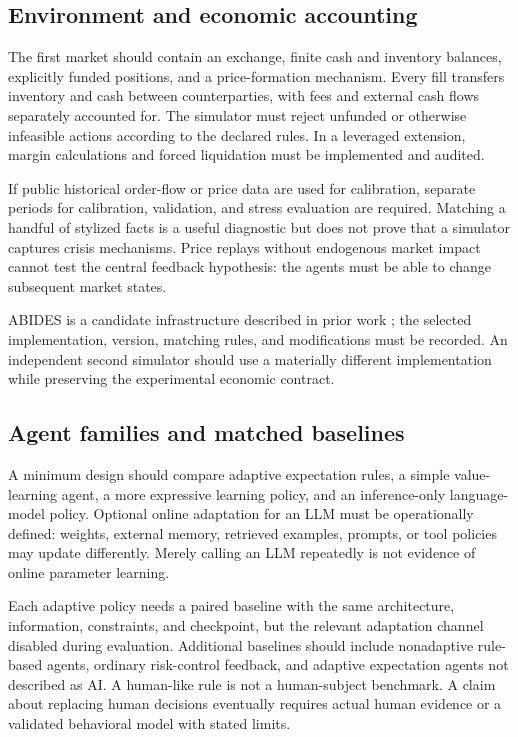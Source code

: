 \documentclass[11pt,a4paper]{article}
\theoremstyle{definition}
\theoremstyle{remark}
\begin{document}
\subsection{Environment and economic accounting}
The first market should contain an exchange, finite cash and inventory balances, explicitly funded positions, and a price-formation mechanism. Every fill transfers inventory and cash between counterparties, with fees and external cash flows separately accounted for. The simulator must reject unfunded or otherwise infeasible actions according to the declared rules. In a leveraged extension, margin calculations and forced liquidation must be implemented and audited.

If public historical order-flow or price data are used for calibration, separate periods for calibration, validation, and stress evaluation are required. Matching a handful of stylized facts is a useful diagnostic but does not prove that a simulator captures crisis mechanisms. Price replays without endogenous market impact cannot test the central feedback hypothesis: the agents must be able to change subsequent market states.

ABIDES is a candidate infrastructure described in prior work \citep{byrd2019}; the selected implementation, version, matching rules, and modifications must be recorded. An independent second simulator should use a materially different implementation while preserving the experimental economic contract.

\subsection{Agent families and matched baselines}
A minimum design should compare adaptive expectation rules, a simple value-learning agent, a more expressive learning policy, and an inference-only language-model policy. Optional online adaptation for an LLM must be operationally defined: weights, external memory, retrieved examples, prompts, or tool policies may update differently. Merely calling an LLM repeatedly is not evidence of online parameter learning.

Each adaptive policy needs a paired baseline with the same architecture, information, constraints, and checkpoint, but the relevant adaptation channel disabled during evaluation. Additional baselines should include nonadaptive rule-based agents, ordinary risk-control feedback, and adaptive expectation agents not described as AI. A human-like rule is not a human-subject benchmark. A claim about replacing human decisions eventually requires actual human evidence or a validated behavioral model with stated limits.
\end{document}
